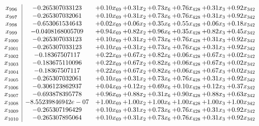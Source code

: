 \documentclass[8pt]{article}
\begin{document}
\[\begin{array}{c| c c@{\hskip 2pt} c@{\hskip 2pt} c@{\hskip 2pt} c@{\hskip 2pt} c@{\hskip 2pt} c@{\hskip 2pt} }
 x_{996}   &  -0.265307033123 & +  0.10 x_{69} & +  0.31 x_{2} & +  0.73 x_{6} & +  0.76 x_{428} & +  0.31 x_{3} & +  0.92 x_{342}\\
 x_{997}   &  -0.265307032061 & +  0.10 x_{69} & +  0.31 x_{2} & +  0.73 x_{6} & +  0.76 x_{428} & +  0.31 x_{3} & +  0.92 x_{342}\\
 x_{998}   &  -0.653061534643 & +  0.02 x_{69} & +  0.06 x_{2} & +  0.35 x_{6} & +  0.55 x_{428} & +  0.06 x_{3} & +  0.18 x_{342}\\
 x_{999}   &  -0.0408168005709 & +  0.94 x_{69} & +  0.82 x_{2} & +  0.96 x_{6} & +  0.35 x_{428} & +  0.82 x_{3} & +  0.45 x_{342}\\
 x_{1000}   &  -0.265307033123 & +  0.10 x_{69} & +  0.31 x_{2} & +  0.73 x_{6} & +  0.76 x_{428} & +  0.31 x_{3} & +  0.92 x_{342}\\
 x_{1001}   &  -0.265307033123 & +  0.10 x_{69} & +  0.31 x_{2} & +  0.73 x_{6} & +  0.76 x_{428} & +  0.31 x_{3} & +  0.92 x_{342}\\
 x_{1002}   &  -0.18367507117 & +  0.22 x_{69} & +  0.67 x_{2} & +  0.82 x_{6} & +  0.06 x_{428} & +  0.67 x_{3} & +  0.02 x_{342}\\
 x_{1003}   &  -0.183675110096 & +  0.22 x_{69} & +  0.67 x_{2} & +  0.82 x_{6} & +  0.06 x_{428} & +  0.67 x_{3} & +  0.02 x_{342}\\
 x_{1004}   &  -0.18367507117 & +  0.22 x_{69} & +  0.67 x_{2} & +  0.82 x_{6} & +  0.06 x_{428} & +  0.67 x_{3} & +  0.02 x_{342}\\
 x_{1005}   &  -0.265307032061 & +  0.10 x_{69} & +  0.31 x_{2} & +  0.73 x_{6} & +  0.76 x_{428} & +  0.31 x_{3} & +  0.92 x_{342}\\
 x_{1006}   &  -0.306123862937 & +  0.04 x_{69} & +  0.12 x_{2} & +  0.69 x_{6} & +  0.10 x_{428} & +  0.12 x_{3} & +  0.37 x_{342}\\
 x_{1007}   &  -0.693878395778 & +  0.96 x_{69} & +  0.88 x_{2} & +  0.31 x_{6} & +  0.90 x_{428} & +  0.88 x_{3} & +  0.63 x_{342}\\
 x_{1008}   &  -8.55239846942e-07 & +  1.00 x_{69} & +  1.00 x_{2} & +  1.00 x_{6} & +  1.00 x_{428} & +  1.00 x_{3} & +  1.00 x_{342}\\
 x_{1009}   &  -0.265307196429 & +  0.10 x_{69} & +  0.31 x_{2} & +  0.73 x_{6} & +  0.76 x_{428} & +  0.31 x_{3} & +  0.92 x_{342}\\
 x_{1010}   &  -0.265307895064 & +  0.10 x_{69} & +  0.31 x_{2} & +  0.73 x_{6} & +  0.76 x_{428} & +  0.31 x_{3} & +  0.92 x_{342}\\

\end{array}\]
\end{document}
